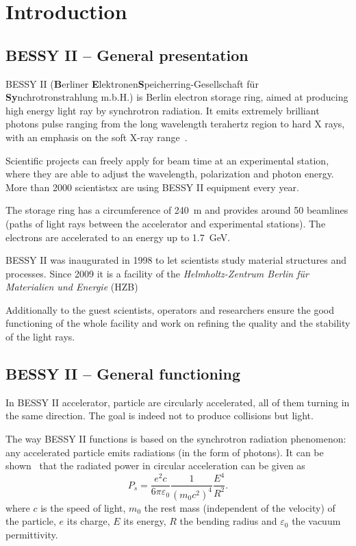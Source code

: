 \chapter{Introduction}
\label{sec:background}

\section{BESSY II -- General presentation}
BESSY II (\textbf{B}erliner \textbf{E}lektronen\-\textbf{S}peicherring-Gesellschaft für \textbf{Sy}n\-chro\-tron\-strahlung m.b.H.) is Berlin electron storage ring, aimed at producing high energy light ray by synchrotron radiation. It emits extremely brilliant photons pulse ranging from the long wavelength terahertz region to hard X rays, with an emphasis on the soft X-ray range~\cite{web:bessy_homepage}.

Scientific projects can freely apply for beam time at an experimental station, where they are able to adjust the wavelength, polarization and photon energy. More than 2000 scientistsx are using BESSY II equipment every year.

The storage ring has a circumference of \SI{240}{\meter} and provides around 50 beamlines (paths of light rays between the accelerator and experimental stations). The electrons are accelerated to an energy up to \SI{1.7}{\giga\electronvolt}.

BESSY II was inaugurated in 1998 to let scientists study material structures and processes. Since 2009 it is a facility of the \textit{Helmholtz-Zentrum Berlin für Materialien und Energie} (HZB)

Additionally to the guest scientists, operators and researchers ensure the good functioning of the whole facility and work on refining the quality and the stability of the light rays.

\section{BESSY II -- General functioning}
In BESSY II  accelerator, particle are circularly accelerated, all of them turning in the same direction. The goal is indeed not to produce collisions but light.

The way BESSY II functions is based on the synchrotron radiation phenomenon: any accelerated particle emits radiations (in the form of photons). It can be shown~\cite{book:wille} that the radiated power in circular acceleration can be given as
\begin{equation}
P_s = \frac{e^2 c}{6 \pi \varepsilon_0}\frac{1}{(m_0 c^2)^4}\frac{E^4}{R^2}.
\end{equation}
where $c$ is the speed of light, $m_0$ the rest mass (independent of the velocity) of the particle, $e$ its charge, $E$ its energy, $R$ the bending radius and $\varepsilon_0$ the  vacuum permittivity.

